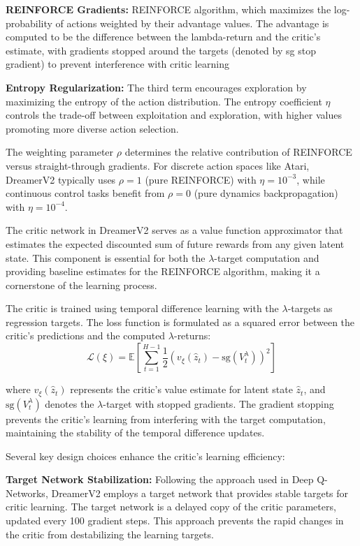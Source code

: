 \documentclass[
	english,
	ruledheaders=section,
	class=report,
	thesis={type=master},
	accentcolor=9c,
	custommargins=true,
	marginpar=false,
	parskip=half-,
	fontsize=11pt,
]{tudapub}
\begin{document}
\textbf{REINFORCE Gradients:}  REINFORCE algorithm, which maximizes the log-probability of actions weighted by their advantage values. The advantage is computed to be the difference between the lambda-return and the critic's estimate, with gradients stopped around the targets (denoted by sg stop gradient) to prevent interference with critic learning

\textbf{Entropy Regularization:} The third term encourages exploration by maximizing the entropy of the action distribution. The entropy coefficient $\eta$ controls the trade-off between exploitation and exploration, with higher values promoting more diverse action selection.

The weighting parameter $\rho$ determines the relative contribution of
REINFORCE versus straight-through gradients. For discrete action spaces like
Atari, DreamerV2 typically uses $\rho = 1$ (pure REINFORCE) with $\eta =
	10^{-3}$, while continuous control tasks benefit from $\rho = 0$ (pure dynamics
backpropagation) with $\eta = 10^{-4}$.

The critic network in DreamerV2 serves as a value function approximator that
estimates the expected discounted sum of future rewards from any given latent
state. This component is essential for both the $\lambda$-target computation
and providing baseline estimates for the REINFORCE algorithm, making it a
cornerstone of the learning process.

The critic is trained using temporal difference learning with the
$\lambda$-targets as regression targets. The loss function is formulated as a
squared error between the critic's predictions and the computed
$\lambda$-returns:
\begin{equation}
	\mathcal{L}(\xi) = \mathbb{E}\left[\sum_{t=1}^{H-1} \frac{1}{2} \left(v_\xi(\hat{z}_t) - \text{sg}(V^{\lambda}_t)\right)^2\right]
\end{equation}

where $v_\xi(\hat{z}_t)$ represents the critic's value estimate for latent
state $\hat{z}_t$, and $\text{sg}(V^{\lambda}_t)$ denotes the $\lambda$-target
with stopped gradients. The gradient stopping prevents the critic's learning
from interfering with the target computation, maintaining the stability of the
temporal difference updates.

Several key design choices enhance the critic's learning efficiency:

\textbf{Target Network Stabilization:} Following the approach used in Deep Q-Networks, DreamerV2 employs a target network that provides stable targets for critic learning. The target network is a delayed copy of the critic parameters, updated every 100 gradient steps. This approach prevents the rapid changes in the critic from destabilizing the learning targets.
\end{document}
